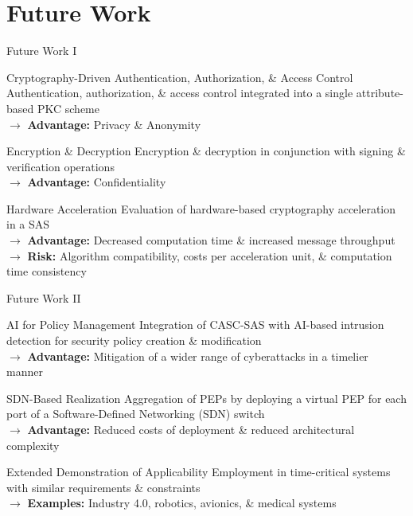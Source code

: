 \documentclass[en]{sdqbeamer}
\begin{document}
\section{Future Work}
\begin{frame}{Future Work I}
    \begin{blueblock}{Cryptography-Driven Authentication, Authorization, \& Access Control}
        Authentication, authorization, \& access control integrated into a single attribute-based PKC scheme
        \\$\rightarrow$ \textbf{Advantage:} Privacy \& Anonymity
    \end{blueblock}
    \begin{blueblock}{Encryption \& Decryption}
        Encryption \& decryption in conjunction with signing \& verification operations
        \\$\rightarrow$ \textbf{Advantage:} Confidentiality
    \end{blueblock}
    \begin{blueblock}{Hardware Acceleration}
        Evaluation of hardware-based cryptography acceleration in a SAS
        \\$\rightarrow$ \textbf{Advantage:} Decreased computation time \& increased message throughput
        \\$\rightarrow$ \textbf{Risk:} Algorithm compatibility, costs per acceleration unit, \& computation time consistency
    \end{blueblock}
\end{frame}
\begin{frame}{Future Work II}
    \begin{blueblock}{AI for Policy Management}
        Integration of CASC-SAS with AI-based intrusion detection for security policy creation \& modification
        \\$\rightarrow$ \textbf{Advantage:} Mitigation of a wider range of cyberattacks in a timelier manner
    \end{blueblock}
    \begin{blueblock}{SDN-Based Realization}
        Aggregation of PEPs by deploying a virtual PEP for each port of a Software-Defined Networking (SDN) switch
        \\$\rightarrow$ \textbf{Advantage:} Reduced costs of deployment \& reduced architectural complexity
    \end{blueblock}
    \begin{blueblock}{Extended Demonstration of Applicability}
        Employment in time-critical systems with similar requirements \& constraints
        \\$\rightarrow$ \textbf{Examples:} Industry 4.0, robotics, avionics, \& medical systems
    \end{blueblock}
\end{frame}
\end{document}

